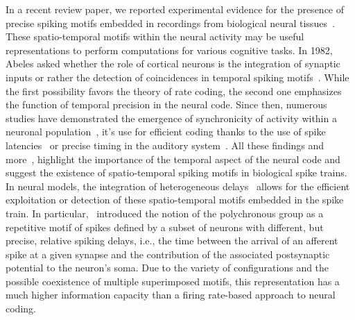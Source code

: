 \documentclass[default]{sn-jnl}%
\theoremstyle{thmstyleone}%
\theoremstyle{thmstyletwo}%
\theoremstyle{thmstylethree}%
\begin{document}
In a recent review paper, we reported experimental evidence for the presence of precise spiking motifs embedded in recordings from biological neural tissues~\cite{grimaldi_precise_2023}. These spatio-temporal motifs within the neural activity may be useful representations to perform computations for various cognitive tasks. In 1982, Abeles asked whether the role of cortical neurons is the integration of synaptic inputs or rather the detection of coincidences in temporal spiking motifs~\citep{abeles_role_1982}. While the first possibility favors the theory of rate coding, the second one emphasizes the function of temporal precision in the neural code. Since then, numerous studies have demonstrated the emergence of synchronicity of activity within a neuronal population~\citep{riehle_spike_1997, davis_spontaneous_2021}, it's use for efficient coding thanks to the use of spike latencies~\citep{perrinet_coding_2004, gollisch_rapid_2008} or precise timing in the auditory system~\citep{deweese_binary_2002, carr_circuit_1990}. All these findings and more~\citep{bohte_evidence_2004}, highlight the importance of the temporal aspect of the neural code and suggest the existence of spatio-temporal spiking motifs in biological spike trains. In neural models, the integration of heterogeneous delays~\citep{guise_bayesian_2014, zhang_supervised_2020, nadafian_bio-plausible_2020} allows for the efficient exploitation or detection of these spatio-temporal motifs embedded in the spike train. In particular,~\citet{izhikevich_polychronization_2006} introduced the notion of the polychronous group as a repetitive motif of spikes defined by a subset of neurons with different, but precise, relative spiking delays, i.e., the time between the arrival of an afferent spike at a given synapse and the contribution of the associated postsynaptic potential to the neuron's soma. Due to the variety of configurations and the possible coexistence of multiple superimposed motifs, this representation has a much higher information capacity than a firing rate-based approach to neural coding.
\end{document}
